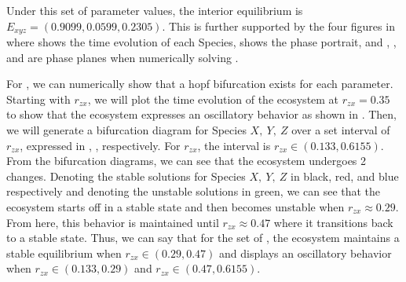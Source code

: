 Under this set of parameter values, the interior equilibrium is $E_{xyz}=(0.9099,0.0599,0.2305)$. This is further supported by the four figures in  where  shows the time evolution of each Species,  shows the phase portrait, and , , and  are phase planes when numerically solving .

For , we can numerically show that a hopf bifurcation exists for each parameter. Starting with $r_{zx}$, we will plot the time evolution of the ecosystem at $r_{zx}=0.35$ to show that the ecosystem expresses an oscillatory behavior as shown in . Then, we will generate a bifurcation diagram for Species $X,\ Y,\ Z$ over a set interval of $r_{zx}$, expressed in , ,  respectively. For $r_{zx}$, the interval is $r_{zx}\in(0.133,0.6155)$. From the bifurcation diagrams, we can see that the ecosystem undergoes 2 changes. Denoting the stable solutions for Species $X,\ Y,\ Z$ in black, red, and blue respectively and denoting the unstable solutions in green, we can see that the ecosystem starts off in a stable state and then becomes unstable when $r_{zx}\approx 0.29$. From here, this behavior is maintained until $r_{zx}\approx 0.47$ where it transitions back to a stable state. Thus, we can say that for the set of , the ecosystem maintains a stable equilibrium when $r_{zx}\in(0.29,0.47)$ and displays an oscillatory behavior when $r_{zx}\in(0.133,0.29)$ and $r_{zx}\in(0.47,0.6155)$.

